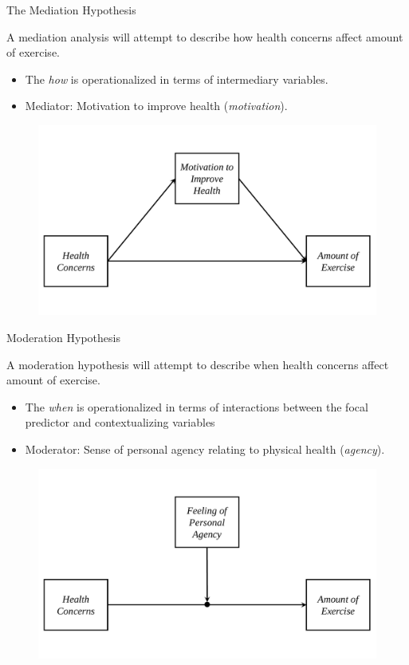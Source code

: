 \documentclass{beamer}
\newcommand{\va}[0]{\vspace{12pt}}
\newcommand{\vx}[1]{\vspace{#1pt}}
\begin{document}
\begin{frame}{The Mediation Hypothesis}

  A mediation analysis will attempt to describe how health concerns
  affect amount of exercise.
  \va
  \begin{itemize}
  \item The \emph{how} is operationalized in terms of intermediary
    variables.
    \va
  \item Mediator: Motivation to improve health (\emph{motivation}).
  \end{itemize}
  
  \vx{-18}

  \begin{figure}
    \includegraphics[width=.8\textwidth]{figures/mediationDiagram.pdf}
  \end{figure}
  
\end{frame}


\begin{frame}{Moderation Hypothesis}
  
  A moderation hypothesis will attempt to describe when health
  concerns affect amount of exercise.
  \va
  \begin{itemize}
    \item The \emph{when} is operationalized in terms of interactions
      between the focal predictor and contextualizing variables
      \va
    \item Moderator: Sense of personal agency relating to physical
      health (\emph{agency}).
  \end{itemize}

  \vx{-18}
  
  \begin{figure}
    \includegraphics[width=.8\textwidth]{figures/moderationDiagram.pdf}
  \end{figure}
  
\end{frame}
\end{document}
